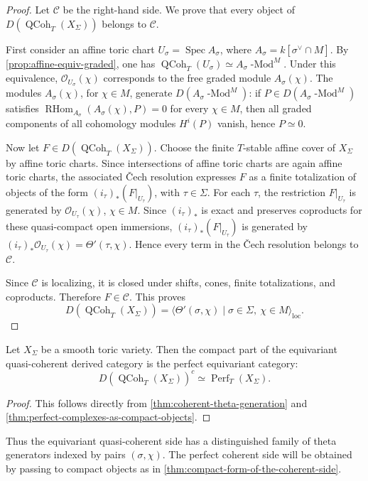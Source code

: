 \begin{proof}
Let \(\mathcal C\) be the right-hand side. We prove that every object of
\(D(\operatorname{QCoh}_T(X_\Sigma))\) belongs to \(\mathcal C\).

First consider an affine toric chart
\(U_\sigma=\operatorname{Spec}A_\sigma\), where
\(A_\sigma=k[\sigma^\vee\cap M]\). By \cref{prop:affine-equiv-graded}, one has
\(\operatorname{QCoh}_T(U_\sigma)\simeq A_\sigma\operatorname{-Mod}^M\).
Under this equivalence, \(\mathcal O_{U_\sigma}(\chi)\) corresponds to the
free graded module \(A_\sigma(\chi)\). The modules \(A_\sigma(\chi)\), for
\(\chi\in M\), generate \(D(A_\sigma\operatorname{-Mod}^M)\): if
\(P\in D(A_\sigma\operatorname{-Mod}^M)\) satisfies
\(\operatorname{RHom}_{A_\sigma}(A_\sigma(\chi),P)=0\) for every
\(\chi\in M\), then all graded components of all cohomology modules
\(H^i(P)\) vanish, hence \(P\simeq 0\).

Now let \(F\in D(\operatorname{QCoh}_T(X_\Sigma))\). Choose the finite
\(T\)-stable affine cover of \(X_\Sigma\) by affine toric charts. Since
intersections of affine toric charts are again affine toric charts, the
associated \v{C}ech resolution expresses \(F\) as a finite totalization of
objects of the form \((i_\tau)_*(F|_{U_\tau})\), with \(\tau\in\Sigma\).
For each \(\tau\), the restriction \(F|_{U_\tau}\) is generated by
\(\mathcal O_{U_\tau}(\chi)\), \(\chi\in M\). Since \((i_\tau)_*\) is exact
and preserves coproducts for these quasi-compact open immersions,
\((i_\tau)_*(F|_{U_\tau})\) is generated by
\((i_\tau)_*\mathcal O_{U_\tau}(\chi)=\Theta'(\tau,\chi)\). Hence every term
in the \v{C}ech resolution belongs to \(\mathcal C\).

Since \(\mathcal C\) is localizing, it is closed under shifts, cones, finite
totalizations, and coproducts. Therefore \(F\in\mathcal C\). This proves
\[
D(\operatorname{QCoh}_T(X_\Sigma))
=
\big\langle \Theta'(\sigma,\chi)\mid \sigma\in\Sigma,\ \chi\in M
\big\rangle_{\mathrm{loc}}.
\]
\end{proof}

\begin{corollary}
\label{thm:compact-form-of-the-coherent-side}
Let \(X_\Sigma\) be a smooth toric variety. Then the compact part of the
equivariant quasi-coherent derived category is the perfect equivariant category:
\[
D(\operatorname{QCoh}_T(X_\Sigma))^c
\simeq
\operatorname{Perf}_T(X_\Sigma).
\]
\end{corollary}

\begin{proof}
This follows directly from
\cref{thm:coherent-theta-generation} and
\cref{thm:perfect-complexes-as-compact-objects}.
\end{proof}

Thus the equivariant quasi-coherent side has a distinguished family of theta
generators indexed by pairs \((\sigma,\chi)\). The perfect coherent side will be
obtained by passing to compact objects as in
\cref{thm:compact-form-of-the-coherent-side}. 